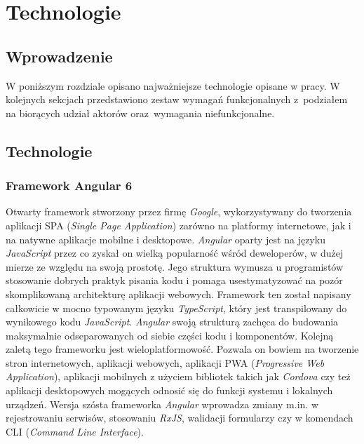 
\chapter{Technologie}

\section{Wprowadzenie}
W poniższym rozdziale opisano najważniejsze technologie opisane w pracy. W kolejnych sekcjach przedstawiono zestaw wymagań funkcjonalnych z~podziałem na biorących udział aktorów oraz~wymagania niefunkcjonalne.

\section{Technologie}

\subsection{Framework Angular 6}
Otwarty framework stworzony przez firmę \textit{Google}, wykorzystywany do tworzenia aplikacji SPA (\textit{Single Page Application}) zarówno na platformy internetowe, jak i na natywne aplikacje mobilne i desktopowe. \textit{Angular} oparty jest na języku \textit{JavaScript} przez co zyskał on wielką popularność wśród deweloperów, w dużej mierze ze względu na swoją prostotę. Jego struktura wymusza u programistów stosowanie dobrych praktyk pisania kodu i pomaga usestymatyzować na pozór skomplikowaną architekturę aplikacji webowych. Framework ten został napisany całkowicie w mocno typowanym języku \textit{TypeScript}, który jest transpilowany do wynikowego kodu \textit{JavaScript}. \textit{Angular} swoją strukturą zachęca do budowania maksymalnie odseparowanych od siebie części kodu i komponentów. Kolejną zaletą tego frameworku jest wieloplatformowość. Pozwala on bowiem na tworzenie stron internetowych, aplikacji webowych, aplikacji PWA (\textit{Progressive Web Application}), aplikacji mobilnych z użyciem bibliotek takich jak \textit{Cordova} czy też aplikacji desktopowych mogących odnosić się do funkcji systemu i lokalnych urządzeń. Wersja szósta frameworka \textit{Angular} wprowadza zmiany m.in. w rejestrowaniu serwisów, stosowaniu \textit{RxJS}, walidacji formularzy czy w komendach CLI (\textit{Command Line Interface}).
 
